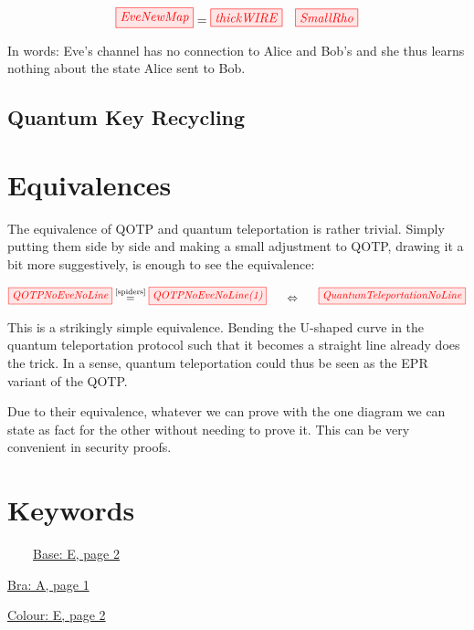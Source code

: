 \documentclass[]{article}
\newcommand{\equaltext}[1]{\ensuremath{\stackrel{\text{#1}}{=}}}
\begin{document}
\begin{equation}
\tikzfig{EveNewMap} = \tikzfig{thickWIRE} ~~~ \tikzfig{SmallRho}
\end{equation}

In words: Eve's channel has no connection to Alice and Bob's and she thus learns nothing about the state Alice sent to Bob.


\subsection{Quantum Key Recycling}




\section{Equivalences}
\label{Equivalences}

The equivalence of QOTP and quantum teleportation is rather trivial. Simply putting them side by side and making a small adjustment to QOTP, drawing it a bit more suggestively, is enough to see the equivalence:

\begin{equation}
\tikzfig{QOTPNoEveNoLine} \equaltext{\ref{spiders}} \tikzfig{QOTPNoEveNoLine(1)}~~~~~ \Leftrightarrow ~~~~~\tikzfig{QuantumTeleportationNoLine}
\end{equation}

This is a strikingly simple equivalence. Bending the U-shaped curve in the quantum teleportation protocol such that it becomes a straight line already does the trick. In a sense, quantum teleportation could thus be seen as the EPR variant of the QOTP. 

Due to their equivalence, whatever we can prove with the one diagram we can state as fact for the other without needing to prove it. This can be very convenient in security proofs.






\appendix


\section{Keywords}
\label{Keywords}


~~~~\hyperref[coloursandbases]{Base: E, page 2}

\hyperref[braandket]{Bra: A, page 1}

\hyperref[coloursandbases]{Colour: E, page 2}
\end{document}
